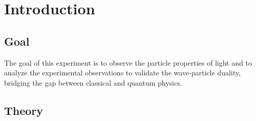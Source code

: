 \section{Introduction}

	\subsection{Goal}
		The goal of this experiment is to observe the particle properties of light and to analyze the experimental observations to validate the wave-particle duality, bridging the gap between classical and quantum physics. 
	
	\subsection{Theory}
		
